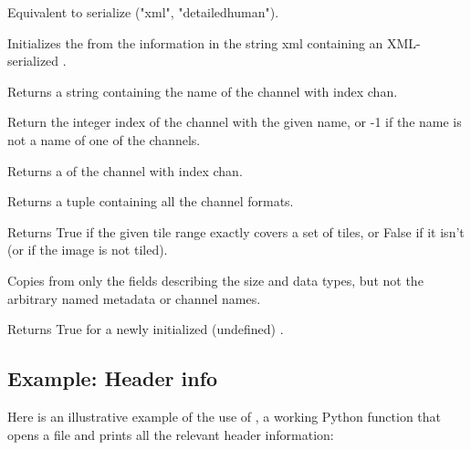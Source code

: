 Equivalent to {\cf serialize ("xml", "detailedhuman")}.
\apiend

Initializes the \ImageSpec from the information in the string {\cf xml}
containing an XML-serialized \ImageSpec.
\apiend

Returns a string containing the name of the channel with index {\cf chan}.
\apiend

Return the integer index of the channel with the given {\cf name}, or
-1 if the name is not a name of one of the channels.
\apiend

Returns a \TypeDesc of the channel with index {\cf chan}.
\apiend

Returns a tuple containing all the channel formats.
\apiend

Returns {\cf True} if the given tile range exactly covers a set of tiles, or
{\cf False} if it isn't (or if the image is not tiled).
\apiend

Copies from  only the fields describing the size
and data types, but not the arbitrary named metadata or channel names.
\apiend

Returns {\cf True} for a newly initialized (undefined) \ImageSpec.
\apiend

\newpage
\subsection*{Example: Header info}

Here is an illustrative example of the use of \ImageSpec, a working Python
function that opens a file and prints all the relevant header
information:

